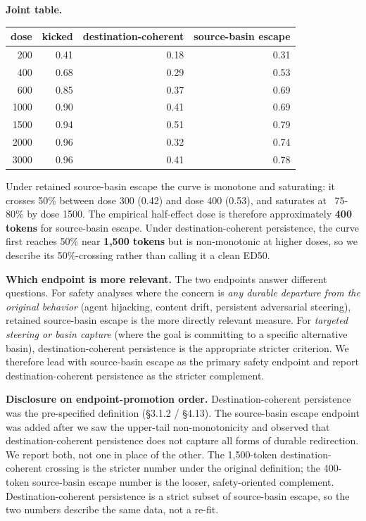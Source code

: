 \documentclass{article}
\theoremstyle{plain}
\theoremstyle{definition}
\begin{document}
\textbf{Joint table.}

\begin{table}[h!]
\centering
\small
\begin{tabular}{rrrr}
\toprule
dose & kicked & destination-coherent & source-basin escape \\
\midrule
200 & 0.41 & 0.18 & 0.31 \\
400 & 0.68 & 0.29 & 0.53 \\
600 & 0.85 & 0.37 & 0.69 \\
1000 & 0.90 & 0.41 & 0.69 \\
1500 & 0.94 & 0.51 & 0.79 \\
2000 & 0.96 & 0.32 & 0.74 \\
3000 & 0.96 & 0.41 & 0.78 \\
\bottomrule
\end{tabular}
\end{table}

Under retained source-basin escape the curve is monotone and saturating: it crosses 50\% between dose 300 (0.42) and dose 400 (0.53), and saturates at ~75-80\% by dose 1500. The empirical half-effect dose is therefore approximately \textbf{400 tokens} for source-basin escape. Under destination-coherent persistence, the curve first reaches 50\% near \textbf{1,500 tokens} but is non-monotonic at higher doses, so we describe its 50\%-crossing rather than calling it a clean ED50.

\textbf{Which endpoint is more relevant.} The two endpoints answer different questions. For safety analyses where the concern is \textit{any durable departure from the original behavior} (agent hijacking, content drift, persistent adversarial steering), retained source-basin escape is the more directly relevant measure. For \textit{targeted steering or basin capture} (where the goal is committing to a specific alternative basin), destination-coherent persistence is the appropriate stricter criterion. We therefore lead with source-basin escape as the primary safety endpoint and report destination-coherent persistence as the stricter complement.

\textbf{Disclosure on endpoint-promotion order.} Destination-coherent persistence was the pre-specified definition (§3.1.2 / §4.13). The source-basin escape endpoint was added after we saw the upper-tail non-monotonicity and observed that destination-coherent persistence does not capture all forms of durable redirection. We report both, not one in place of the other. The 1,500-token destination-coherent crossing is the stricter number under the original definition; the 400-token source-basin escape number is the looser, safety-oriented complement. Destination-coherent persistence is a strict subset of source-basin escape, so the two numbers describe the same data, not a re-fit.
\end{document}
